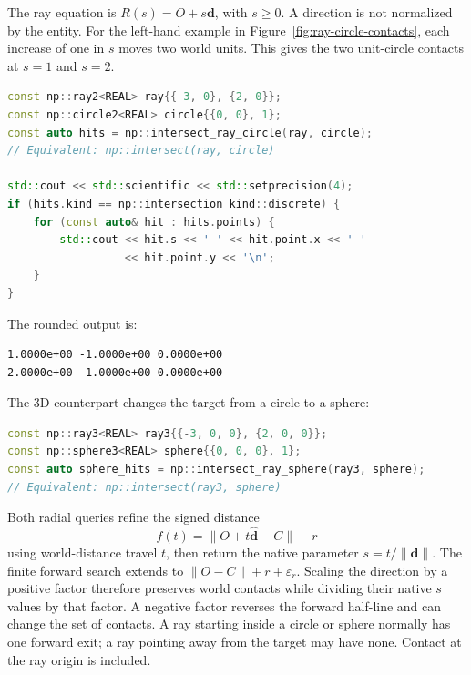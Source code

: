 The ray equation is $R(s)=O+s\mathbf d$, with $s\geq0$. A direction is
not normalized by the entity. For the left-hand example in
Figure~\ref{fig:ray-circle-contacts}, each increase of one in $s$ moves two
world units. This gives the two unit-circle contacts at $s=1$ and $s=2$.
\par\noindent\begin{minipage}{\linewidth}
\begin{lstlisting}[language=C++]
const np::ray2<REAL> ray{{-3, 0}, {2, 0}};
const np::circle2<REAL> circle{{0, 0}, 1};
const auto hits = np::intersect_ray_circle(ray, circle);
// Equivalent: np::intersect(ray, circle)

std::cout << std::scientific << std::setprecision(4);
if (hits.kind == np::intersection_kind::discrete) {
    for (const auto& hit : hits.points) {
        std::cout << hit.s << ' ' << hit.point.x << ' '
                  << hit.point.y << '\n';
    }
}
\end{lstlisting}
\end{minipage}\par
The rounded output is:
\par\noindent\begin{minipage}{\linewidth}
\begin{lstlisting}
1.0000e+00 -1.0000e+00 0.0000e+00
2.0000e+00  1.0000e+00 0.0000e+00
\end{lstlisting}
\end{minipage}\par
The 3D counterpart changes the target from a circle to a sphere:
\par\noindent\begin{minipage}{\linewidth}
\begin{lstlisting}[language=C++]
const np::ray3<REAL> ray3{{-3, 0, 0}, {2, 0, 0}};
const np::sphere3<REAL> sphere{{0, 0, 0}, 1};
const auto sphere_hits = np::intersect_ray_sphere(ray3, sphere);
// Equivalent: np::intersect(ray3, sphere)
\end{lstlisting}
\end{minipage}\par
Both radial queries refine the signed distance
\[
 f(t)=\|O+t\widehat{\mathbf d}-C\|-r
\]
using world-distance travel $t$, then return the native parameter
$s=t/\|\mathbf d\|$. The finite forward search extends to
$\|O-C\|+r+\varepsilon_r$. Scaling the direction by a positive factor therefore
preserves world contacts while dividing their native $s$ values by that factor.
A negative factor reverses the forward half-line and can change the set of
contacts. A ray starting inside a circle or sphere normally has one forward
exit; a ray pointing away from the target may have none. Contact at the ray
origin is included.

